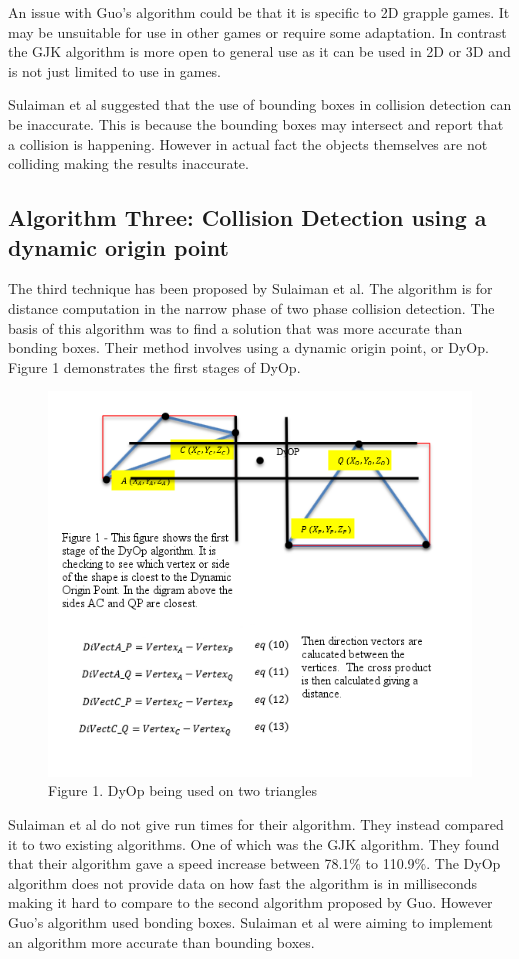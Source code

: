 \documentclass{scrartcl}
\begin{document}
An issue with Guo's algorithm could be that it is specific to 2D grapple games. It may be unsuitable for use in other games or require some adaptation. In contrast the GJK algorithm is more open to general use as it can be used in 2D or 3D and is not just limited to use in games.
	
Sulaiman et al \cite{Sulaiman} suggested that the use of bounding boxes in collision detection can be inaccurate. This is because the bounding boxes may intersect and report that a collision is happening. However in actual fact the objects themselves are not colliding making the results inaccurate.
	
	
\subsection{Algorithm Three: Collision Detection using a dynamic origin point }
The third technique has been proposed by Sulaiman et al\cite{Sulaiman}. The algorithm is for distance computation in the narrow phase of two phase collision detection. The basis of this algorithm was to find a solution that was more accurate than bonding boxes. Their method involves using a dynamic origin point, or DyOp. Figure 1 demonstrates the first stages of DyOp.
\begin{figure}[h]
	\includegraphics[width=1.0\linewidth]{A3figure.png}
	\caption{Figure 1. DyOp being used on two triangles \cite{Sulaiman}}
\end{figure}
\newline
\newline	
Sulaiman et al do not give run times for their algorithm. They instead compared it to two existing algorithms. One of which was the GJK  algorithm. They found that their algorithm gave a speed increase  between 78.1\% to 110.9\%. The DyOp algorithm does not provide data on how fast the algorithm is in milliseconds making it hard to compare to the second algorithm proposed by Guo. However Guo’s algorithm used bonding boxes. Sulaiman et al were aiming to implement an algorithm more accurate than bounding boxes.
	
\end{document}

